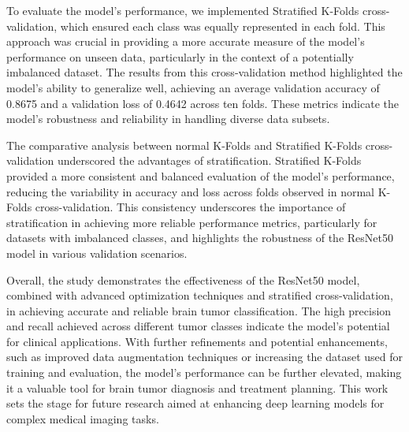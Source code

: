 To evaluate the model's performance, we implemented Stratified K-Folds cross-validation, which ensured each class was equally represented in each fold. This approach was crucial in providing a more accurate measure of the model's performance on unseen data, particularly in the context of a potentially imbalanced dataset. The results from this cross-validation method highlighted the model's ability to generalize well, achieving an average validation accuracy of 0.8675 and a validation loss of 0.4642 across ten folds. These metrics indicate the model's robustness and reliability in handling diverse data subsets.

The comparative analysis between normal K-Folds and Stratified K-Folds cross-validation underscored the advantages of stratification. Stratified K-Folds provided a more consistent and balanced evaluation of the model's performance, reducing the variability in accuracy and loss across folds observed in normal K-Folds cross-validation. This consistency underscores the importance of stratification in achieving more reliable performance metrics, particularly for datasets with imbalanced classes, and highlights the robustness of the ResNet50 model in various validation scenarios.

Overall, the study demonstrates the effectiveness of the ResNet50 model, combined with advanced optimization techniques and stratified cross-validation, in achieving accurate and reliable brain tumor classification. The high precision and recall achieved across different tumor classes indicate the model's potential for clinical applications. With further refinements and potential enhancements, such as improved data augmentation techniques or increasing the dataset used for training and evaluation, the model's performance can be further elevated, making it a valuable tool for brain tumor diagnosis and treatment planning. This work sets the stage for future research aimed at enhancing deep learning models for complex medical imaging tasks.
